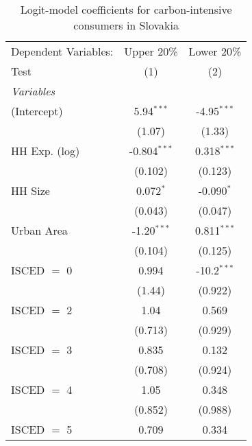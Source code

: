 
\begin{table}[htbp!]
   \centering
   \small
   \begin{adjustbox}{width = 1\textwidth, max height = 0.95\textheight, center}
      \begin{threeparttable}[b]
         \caption{\label{tab:Logit_1_SVK} Logit-model coefficients for carbon-intensive consumers in Slovakia}
         \begin{tabular}{lcc}
            \tabularnewline \midrule \midrule
            Dependent Variables: & Upper 20\%     & Lower 20\%\\   
            Test                 & (1)            & (2)\\  
            \midrule
            \emph{Variables}\\
            (Intercept)          & 5.94$^{***}$   & -4.95$^{***}$\\   
                                 & (1.07)         & (1.33)\\   
            HH Exp. (log)        & -0.804$^{***}$ & 0.318$^{***}$\\   
                                 & (0.102)        & (0.123)\\   
            HH Size              & 0.072$^{*}$    & -0.090$^{*}$\\   
                                 & (0.043)        & (0.047)\\   
            Urban Area           & -1.20$^{***}$  & 0.811$^{***}$\\   
                                 & (0.104)        & (0.125)\\   
            ISCED $=$ 0          & 0.994          & -10.2$^{***}$\\   
                                 & (1.44)         & (0.922)\\   
            ISCED $=$ 2          & 1.04           & 0.569\\   
                                 & (0.713)        & (0.929)\\   
            ISCED $=$ 3          & 0.835          & 0.132\\   
                                 & (0.708)        & (0.924)\\   
            ISCED $=$ 4          & 1.05           & 0.348\\   
                                 & (0.852)        & (0.988)\\   
            ISCED $=$ 5          & 0.709          & 0.334\\   

\end{tabular}
\end{threeparttable}
\end{adjustbox}
\end{table}
